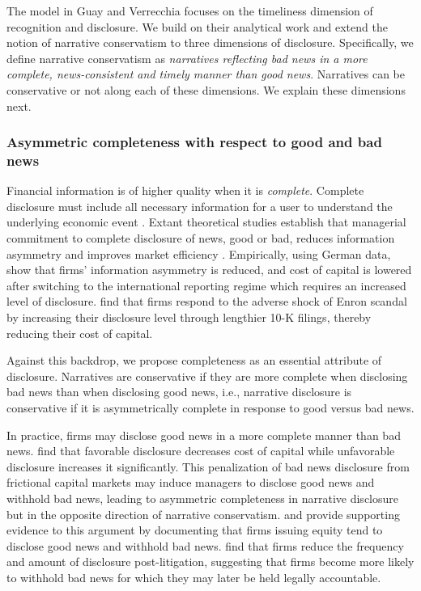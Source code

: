 \documentclass[letterpaper,12pt]{article}
\begin{document}
\begin{spacing}{1.5}
The model in Guay and Verrecchia \citeyear{guayConservativeDisclosure2018} focuses on the timeliness dimension of recognition and disclosure. We build on their analytical work and extend the notion of narrative conservatism to three dimensions of disclosure. Specifically, we define narrative conservatism as \textit{narratives reflecting bad news in a more complete, news-consistent and timely manner than good news}. Narratives can be conservative or not along each of these dimensions. We explain these dimensions next.

\subsubsection{Asymmetric completeness with respect to good and bad news}

\noindent Financial information is of higher quality when it is \textit{complete}. Complete disclosure must include all necessary information for a user to understand the underlying economic event \cite{fasbConceptualFrameworkFinancial2018}. Extant theoretical studies establish that managerial commitment to complete disclosure of news, good or bad, reduces information asymmetry and improves market efficiency \cite{glostenBidAskTransaction1985, diamondOptimalReleaseInformation1985, diamondDisclosureLiquidityCost1991, baimanRelationCapitalMarkets1996}. Empirically, using German data,  show that firms' information asymmetry is reduced, and cost of capital is lowered after switching to the international reporting regime which requires an increased level of disclosure.  find that firms respond to the adverse shock of Enron scandal by increasing their disclosure level through lengthier 10-K filings, thereby reducing their cost of capital. 

Against this backdrop, we propose completeness as an essential attribute of disclosure. Narratives are conservative if they are more complete when disclosing bad news than when disclosing good news, i.e., narrative disclosure is conservative if it is asymmetrically complete in response to good versus bad news. 

In practice, firms may disclose good news in a more complete manner than bad news.  find that favorable disclosure decreases cost of capital while unfavorable disclosure increases it significantly. This penalization of bad news disclosure from frictional capital markets may induce managers to disclose good news and withhold bad news, leading to asymmetric completeness in narrative disclosure but in the opposite direction of narrative conservatism.  and  provide supporting evidence to this argument by documenting that firms issuing equity tend to disclose good news and withhold bad news.  find that firms reduce the frequency and amount of disclosure post-litigation, suggesting that firms become more likely to withhold bad news for which they may later be held legally accountable. 


\end{spacing}
\end{document}

